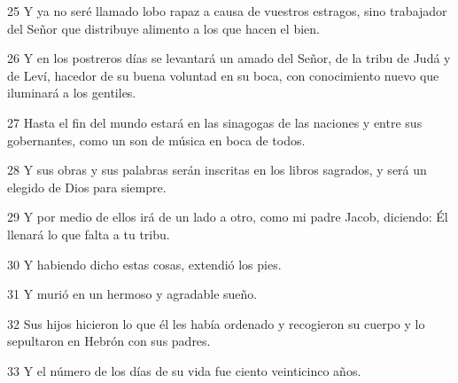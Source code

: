 \par 25 Y ya no seré llamado lobo rapaz a causa de vuestros estragos, sino trabajador del Señor que distribuye alimento a los que hacen el bien.

\par 26 Y en los postreros días se levantará un amado del Señor, de la tribu de Judá y de Leví, hacedor de su buena voluntad en su boca, con conocimiento nuevo que iluminará a los gentiles.

\par 27 Hasta el fin del mundo estará en las sinagogas de las naciones y entre sus gobernantes, como un son de música en boca de todos.

\par 28 Y sus obras y sus palabras serán inscritas en los libros sagrados, y será un elegido de Dios para siempre.

\par 29 Y por medio de ellos irá de un lado a otro, como mi padre Jacob, diciendo: Él llenará lo que falta a tu tribu.

\par 30 Y habiendo dicho estas cosas, extendió los pies.

\par 31 Y murió en un hermoso y agradable sueño.

\par 32 Sus hijos hicieron lo que él les había ordenado y recogieron su cuerpo y lo sepultaron en Hebrón con sus padres.

\par 33 Y el número de los días de su vida fue ciento veinticinco años.


